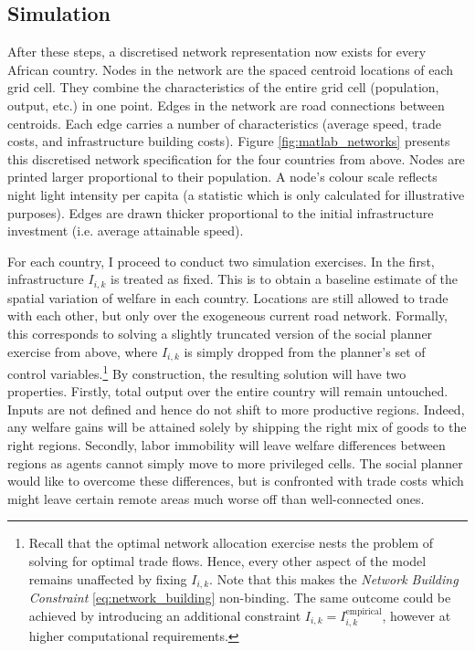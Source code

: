 \documentclass[11pt, oneside]{article}   	%
\begin{document}
\subsection{Simulation}

After these steps, a discretised network representation now exists for every African country. Nodes in the network are the spaced centroid locations of each grid cell. They combine the characteristics of the entire grid cell (population, output, etc.) in one point. Edges in the network are road connections between centroids. Each edge carries a number of characteristics (average speed, trade costs, and infrastructure building costs). Figure \eqref{fig:matlab_networks} presents this discretised network specification for the four countries from above. Nodes are printed larger proportional to their population. A node's colour scale reflects night light intensity per capita (a statistic which is only calculated for illustrative purposes). Edges are drawn thicker proportional to the initial infrastructure investment (i.e. average attainable speed).

For each country, I proceed to conduct two simulation exercises. In the first, infrastructure $I_{i,k}$ is treated as fixed. This is to obtain a baseline estimate of the spatial variation of welfare in each country. Locations are still allowed to trade with each other, but only over the exogeneous current road network. Formally, this corresponds to solving a slightly truncated version of the social planner exercise from above, where $I_{i,k}$ is simply dropped from the planner's set of control variables.\footnote{Recall that the optimal network allocation exercise nests the problem of solving for optimal trade flows. Hence, every other aspect of the model remains unaffected by fixing $I_{i,k}$. Note that this makes the \emph{Network Building Constraint} \eqref{eq:network_building} non-binding. The same outcome could be achieved by introducing an additional constraint $I_{i,k} = I_{i,k}^{\textrm{empirical}}$, however at higher computational requirements.} By construction, the resulting solution will have two properties. Firstly, total output over the entire country will remain untouched. Inputs are not defined and hence do not shift to more productive regions. Indeed, any welfare gains will be attained solely by shipping the right mix of goods to the right regions. Secondly, labor immobility will leave welfare differences between regions as agents cannot simply move to more privileged cells. The social planner would like to overcome these differences, but is confronted with trade costs which might leave certain remote areas much worse off than well-connected ones.
\end{document}
